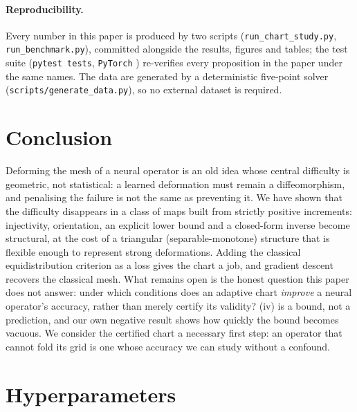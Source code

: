 \documentclass[11pt,a4paper]{article}
\theoremstyle{plain}
\theoremstyle{definition}
\newcommand{\code}[1]{\texttt{#1}}
\begin{document}
\paragraph{Reproducibility.}  Every number in this paper is produced by two
scripts (\code{run\_chart\_study.py}, \code{run\_benchmark.py}), committed
alongside the results, figures and tables; the test suite
(\code{pytest tests}, \code{PyTorch} \cite{paszke2019pytorch}) re-verifies every
proposition in the paper under the same names.  The data are generated by a deterministic five-point solver
(\code{scripts/generate\_data.py}), so no external dataset is required.

\section{Conclusion}

Deforming the mesh of a neural operator is an old idea whose central difficulty
is geometric, not statistical: a learned deformation must remain a
diffeomorphism, and penalising the failure is not the same as preventing it.  We
have shown that the difficulty disappears in a class of maps built from
strictly positive increments: injectivity, orientation, an explicit lower bound
and a closed-form inverse become structural, at the cost of a triangular
(separable-monotone) structure that is flexible enough to represent strong
deformations.  Adding the classical equidistribution criterion as a loss gives
the chart a job, and gradient descent recovers the classical mesh.  What remains
open is the honest question this paper does not answer: under which conditions
does an adaptive chart \emph{improve} a neural operator's accuracy, rather than
merely certify its validity?  (iv) is a bound, not a prediction,
and our own negative result shows how quickly the bound becomes vacuous.  We
consider the certified chart a necessary first step: an operator that cannot fold
its grid is one whose accuracy we can study without a confound.




\appendix
\section{Hyperparameters}
\label{app:hparams}
\end{document}
